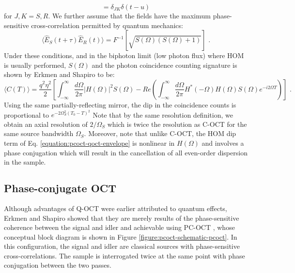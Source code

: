 \begin{equation}
[ \hat{E_J}(t), \hat{E_K}^+(u) ] = \delta_{JK} \delta(t-u)
\end{equation}
for $J, K = S, R$. We further assume that the fields have the maximum phase-sensitive cross-correlation permitted by quantum mechanics:
\begin{equation}
\langle \hat{E}_S(t+\tau) \hat{E}_R(t) \rangle = F^{-1} [\sqrt{S(\Omega)(S(\Omega) +1)}]\,\,.
\end{equation}
Under these conditions, and in the biphoton limit (low photon flux) where HOM is usually performed, $S(\Omega)$ and the photon coincidence counting signature is shown by Erkmen and Shapiro \cite{erkmen-pcoct} to be:
\begin{equation}
\langle C(T) \rangle = \frac{q^2\eta^2}{2} \left[ \int_{-\infty}^{\infty} \frac{d\Omega}{2\pi} |H(\Omega)|^2 S(\Omega) - Re\left( \int_{-\infty}^{\infty} \frac{d\Omega}{2\pi} H^*(-\Omega)H(\Omega)S(\Omega)e^{-i2\Omega T} \right) \right]\,\,.
\label{equation:pcoct-qoct-envelope}
\end{equation}
Using the same partially-reflecting mirror, the dip in the coincidence counts is proportional to  $e^{-2\Omega_S^2 (T_0 - T)^2}$ Note that by the same resolution definition, we obtain an axial resolution of $2/\Omega_S$ which is twice the resolution as C-OCT for the same source bandwidth $\Omega_S$. Moreover, note that unlike C-OCT, the HOM dip term of Eq. \ref{equation:pcoct-qoct-envelope} is nonlinear in $H(\Omega)$ and involves a phase conjugation which will result in the cancellation of all even-order dispersion in the sample.

\subsection{Phase-conjugate OCT}

Although advantages of Q-OCT were earlier attributed to quantum effects, Erkmen and Shapiro showed that they are merely results of the phase-sensitive coherence between the signal and idler and achievable using PC-OCT \cite{erkmen-pcoct}, whose conceptual block diagram is shown in Figure \ref{figure:pcoct-schematic-pcoct}. In this configuration, the signal and idler are classical sources with phase-sensitive cross-correlations. The sample is interrogated twice at the same point with phase conjugation between the two passes.

